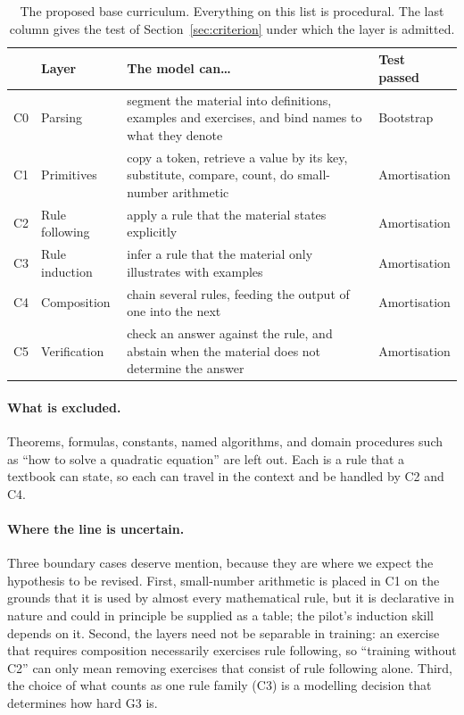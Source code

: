 \documentclass[11pt]{article}
\begin{document}
\begin{table}[t]
\centering
\small
\begin{tabular}{@{}llp{6.3cm}l@{}}
\toprule
 & \textbf{Layer} & \textbf{The model can\ldots} & \textbf{Test passed} \\
\midrule
C0 & Parsing        & segment the material into definitions, examples and exercises, and bind names to what they denote & Bootstrap \\
C1 & Primitives     & copy a token, retrieve a value by its key, substitute, compare, count, do small-number arithmetic & Amortisation \\
C2 & Rule following & apply a rule that the material states explicitly & Amortisation \\
C3 & Rule induction & infer a rule that the material only illustrates with examples & Amortisation \\
C4 & Composition    & chain several rules, feeding the output of one into the next & Amortisation \\
C5 & Verification   & check an answer against the rule, and abstain when the material does not determine the answer & Amortisation \\
\bottomrule
\end{tabular}
\caption{The proposed base curriculum. Everything on this list is procedural. The last column gives the test of Section~\ref{sec:criterion} under which the layer is admitted.}
\label{tab:curriculum}
\end{table}

\paragraph{What is excluded.}
Theorems, formulas, constants, named algorithms, and domain procedures such as ``how to solve a quadratic equation'' are left out.
Each is a rule that a textbook can state, so each can travel in the context and be handled by C2 and C4.

\paragraph{Where the line is uncertain.}
Three boundary cases deserve mention, because they are where we expect the hypothesis to be revised.
First, small-number arithmetic is placed in C1 on the grounds that it is used by almost every mathematical rule, but it is declarative in nature and could in principle be supplied as a table; the pilot's induction skill depends on it.
Second, the layers need not be separable in training: an exercise that requires composition necessarily exercises rule following, so ``training without C2'' can only mean removing exercises that consist of rule following alone.
Third, the choice of what counts as one rule family (C3) is a modelling decision that determines how hard G3 is.
\end{document}
